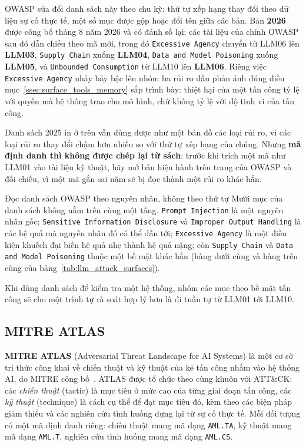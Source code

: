 OWASP sửa đổi danh sách này theo chu kỳ: thứ tự xếp hạng thay đổi theo dữ liệu sự cố thực tế, một số mục được gộp hoặc đổi tên giữa các bản. Bản \textbf{2026} được công bố tháng 8 năm 2026 và có đánh số lại; các tài liệu của chính OWASP sau đó dẫn chiếu theo mã mới, trong đó \texttt{Excessive Agency} chuyển từ LLM06 lên \textbf{LLM03}, \texttt{Supply Chain} xuống \textbf{LLM04}, \texttt{Data and Model Poisoning} xuống \textbf{LLM05}, và \texttt{Unbounded Consumption} từ LLM10 lên \textbf{LLM06}. Riêng việc \texttt{Excessive Agency} nhảy bảy bậc lên nhóm ba rủi ro đầu phản ánh đúng điều mục~\ref{ssec:surface_tools_memory} sắp trình bày: thiệt hại của một tấn công tỷ lệ với quyền mà hệ thống trao cho mô hình, chứ không tỷ lệ với độ tinh vi của tấn công.

Danh sách 2025 in ở trên vẫn dùng được như một bản đồ các loại rủi ro, vì các loại rủi ro thay đổi chậm hơn nhiều so với thứ tự xếp hạng của chúng. Nhưng \textbf{mã định danh thì không được chép lại từ sách}: trước khi trích một mã như LLM01 vào tài liệu kỹ thuật, hãy mở bản hiện hành trên trang của OWASP và đối chiếu, vì một mã gắn sai năm sẽ bị đọc thành một rủi ro khác hẳn.

\begin{deepdive}{Đọc danh sách OWASP theo nguyên nhân, không theo thứ tự}
Mười mục của danh sách không nằm trên cùng một tầng. \texttt{Prompt Injection} là một nguyên nhân gốc; \texttt{Sensitive Information Disclosure} và \texttt{Improper Output Handling} là các hệ quả mà nguyên nhân đó có thể dẫn tới; \texttt{Excessive Agency} là một điều kiện khuếch đại biến hệ quả nhẹ thành hệ quả nặng; còn \texttt{Supply Chain} và \texttt{Data and Model Poisoning} thuộc một bề mặt khác hẳn (hàng dưới cùng và hàng trên cùng của bảng~\ref{tab:llm_attack_surfaces}).

Khi dùng danh sách để kiểm tra một hệ thống, nhóm các mục theo bề mặt tấn công sẽ cho một trình tự rà soát hợp lý hơn là đi tuần tự từ LLM01 tới LLM10.
\end{deepdive}

\subsection{MITRE ATLAS}
\label{ssec:mitre_atlas}

\textbf{MITRE ATLAS} (Adversarial Threat Landscape for AI Systems) là một cơ sở tri thức công khai về chiến thuật và kỹ thuật của kẻ tấn công nhắm vào hệ thống AI, do MITRE công bố~\cite{mitreatlas}. ATLAS được tổ chức theo cùng khuôn với ATT\&CK: các \emph{chiến thuật} (tactic) là mục tiêu ở mức cao của từng giai đoạn tấn công, các \emph{kỹ thuật} (technique) là cách cụ thể để đạt mục tiêu đó, kèm theo các biện pháp giảm thiểu và các nghiên cứu tình huống dựng lại từ sự cố thực tế. Mỗi đối tượng có một mã định danh riêng: chiến thuật mang mã dạng \texttt{AML.TA}, kỹ thuật mang mã dạng \texttt{AML.T}, nghiên cứu tình huống mang mã dạng \texttt{AML.CS}.

